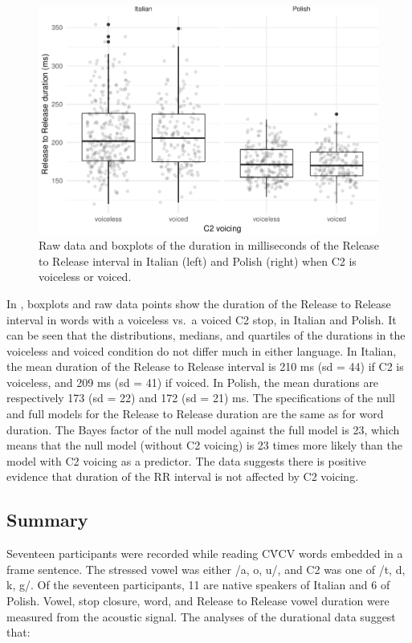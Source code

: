 \documentclass[preprint]{JASAnew}
\begin{document}
\begin{figure}
\includegraphics[width=\linewidth]{2018-jasa_files/figure-latex/rr-plot-1} \caption{Raw data and boxplots of the duration in milliseconds of the Release to Release interval in Italian (left) and Polish (right) when C2 is voiceless or voiced.}\label{f:rr-plot}
\end{figure}

In , boxplots and raw data points show the duration of
the Release to Release interval in words with a voiceless vs.~a voiced
C2 stop, in Italian and Polish. It can be seen that the distributions,
medians, and quartiles of the durations in the voiceless and voiced
condition do not differ much in either language. In Italian, the mean
duration of the Release to Release interval is 210 ms (sd = 44) if C2 is
voiceless, and 209 ms (sd = 41) if voiced. In Polish, the mean durations
are respectively 173 (sd = 22) and 172 (sd = 21) ms. The specifications
of the null and full models for the Release to Release duration are the
same as for word duration. The Bayes factor of the null model against
the full model is 23, which means that the null model (without C2
voicing) is 23 times more likely than the model with C2 voicing as a
predictor. The data suggests there is positive evidence that duration of
the RR interval is not affected by C2 voicing.

\hypertarget{summary}{%
\subsection{Summary}\label{summary}}

Seventeen participants were recorded while reading CV́CV words embedded
in a frame sentence. The stressed vowel was either /a, o, u/, and C2 was
one of /t, d, k, g/. Of the seventeen participants, 11 are native
speakers of Italian and 6 of Polish. Vowel, stop closure, word, and
Release to Release vowel duration were measured from the acoustic
signal. The analyses of the durational data suggest that:
\end{document}
